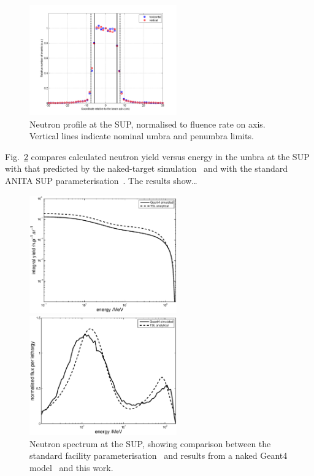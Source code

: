 \documentclass[11pt,a4paper]{IEEEtran}
\let\MYoriglatexcaption\caption
\renewcommand{\caption}[2][\relax]{\MYoriglatexcaption[#2]{#2}}
\begin{document}
\begin{figure}[t]
    \includegraphics[width=2.5in]{SUP10beamproFoldingRADECS.png}
    \caption{
        Neutron profile at the SUP, normalised to fluence rate on axis.
        Vertical lines indicate nominal umbra and penumbra limits.
    }
    \label{fig:SUPProfile}
\end{figure}

Fig.~\ref{fig:SUPSpectraComparison} compares calculated neutron yield versus energy in the umbra at the SUP with that predicted by the naked-target simulation~\cite{Platt13} and with the standard ANITA SUP parameterisation~\cite{Prokofiev2009}.
The results show\ldots
{}

\begin{figure}[t]
    \begin{minipage}{\columnwidth}
        \includegraphics[width=2.5in]{ANITAIntYieldRADECS.eps}
    \end{minipage}
    \begin{minipage}{\columnwidth}
        \includegraphics[width=2.5in]{ANITALetYieldnormalisedRADECS.eps}
    \end{minipage}
	\caption{
        Neutron spectrum at the SUP, showing comparison between the standard facility parameterisation~\cite{Prokofiev2009} and results from a naked Geant4 model~\cite{Platt13} and this work.
    }
	\label{fig:SUPSpectraComparison}
\end{figure}
\end{document}
